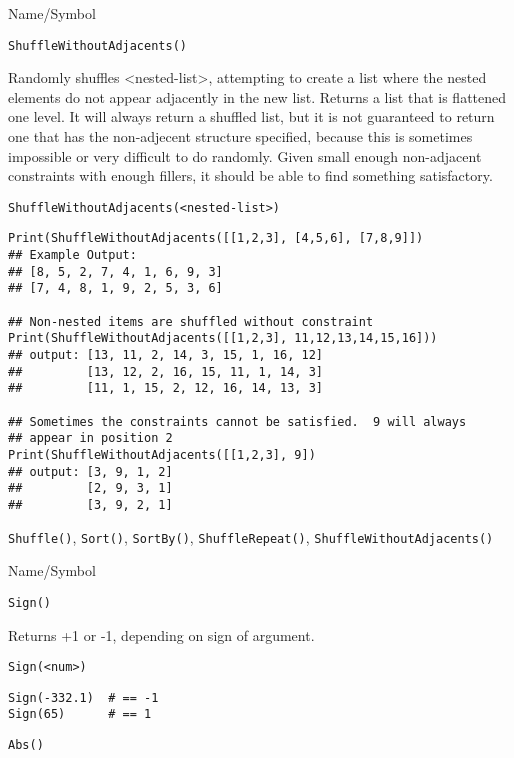 \begin{desc}{Name/Symbol}
\item[Name/Symbol] 	\verb+ShuffleWithoutAdjacents()+

\item[Description] 	Randomly shuffles  <nested-list>, attempting to
  create a list where the nested elements do not appear adjacently in
  the new list. Returns a list that is flattened one level. It will
  always return a shuffled list, but it is not guaranteed to return
  one that has the non-adjecent structure specified, because this is
  sometimes impossible or very difficult to do randomly.  Given small
  enough non-adjacent constraints with enough fillers, it should be
  able to find something satisfactory.

\item[Usage]    
\begin{verbatim}
ShuffleWithoutAdjacents(<nested-list>)
\end{verbatim}

\item[Example]

\begin{verbatim}
Print(ShuffleWithoutAdjacents([[1,2,3], [4,5,6], [7,8,9]])
## Example Output: 
## [8, 5, 2, 7, 4, 1, 6, 9, 3]
## [7, 4, 8, 1, 9, 2, 5, 3, 6]

## Non-nested items are shuffled without constraint
Print(ShuffleWithoutAdjacents([[1,2,3], 11,12,13,14,15,16]))
## output: [13, 11, 2, 14, 3, 15, 1, 16, 12]
##         [13, 12, 2, 16, 15, 11, 1, 14, 3]
##         [11, 1, 15, 2, 12, 16, 14, 13, 3]

## Sometimes the constraints cannot be satisfied.  9 will always
## appear in position 2
Print(ShuffleWithoutAdjacents([[1,2,3], 9])
## output: [3, 9, 1, 2]
##         [2, 9, 3, 1]
##         [3, 9, 2, 1]
\end{verbatim}

\item[See Also]    	\verb+Shuffle()+, \verb+Sort()+, \verb+SortBy()+,
        \verb+ShuffleRepeat()+, \verb+ShuffleWithoutAdjacents()+
\end{desc}

\rl


\begin{desc}{Name/Symbol}
\item[Name/Symbol] 	\verb+Sign()+

\item[Description] 	Returns +1 or -1, depending on sign of argument.

\item[Usage]
\begin{verbatim}
Sign(<num>)
\end{verbatim}

\item[Example]
\begin{verbatim}
Sign(-332.1)  # == -1
Sign(65)      # == 1

\end{verbatim}

\item[See Also]     	\verb+Abs()+
\end{desc}

